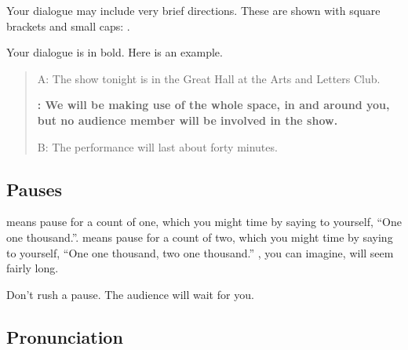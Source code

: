   \setlength{\fboxrule}{2pt}%
  \vspace{0.3\baselineskip}%
  \setlength{\fboxrule}{1pt}%
  \vspace{0.3\baselineskip}


\vspace{0.5\baselineskip}
\vspace{0.5\baselineskip}



Your dialogue may include very brief directions.  These are shown with square brackets and small caps: .

Your dialogue is in bold.  Here is an example.

\begin{quote}

A:  The show tonight is in the Great Hall at the Arts and Letters Club.

\textbf{\performerletter{\speaker}:   We will be making use of the whole space, in and around you, but no audience member will be involved in the show.}

B:  The performance will last about forty minutes.

\end{quote}

\subsection*{Pauses}

 means pause for a count of one, which you might time by saying to yourself, ``One one thousand.''.   means pause for a count of two, which you might time by saying to yourself, ``One one thousand, two one thousand.''  , you can imagine, will seem fairly long.

Don't rush a pause.  The audience will wait for you.

\subsection*{Pronunciation}

